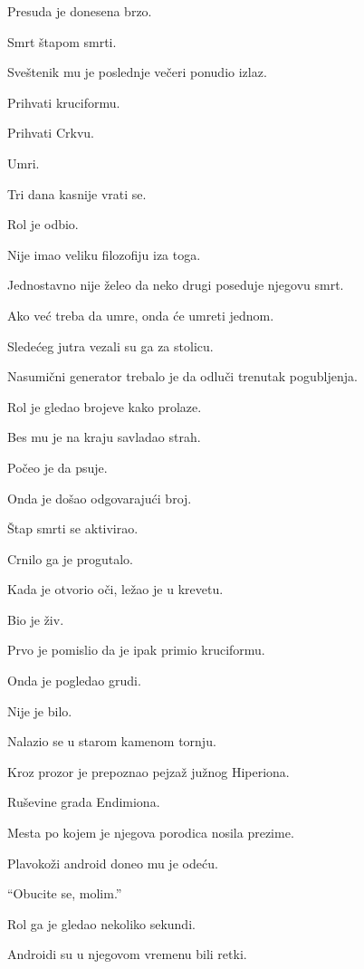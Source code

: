 Presuda je donesena brzo.

Smrt štapom smrti.

\bigskip

Sveštenik mu je poslednje večeri ponudio izlaz.

Prihvati kruciformu.

Prihvati Crkvu.

Umri.

Tri dana kasnije vrati se.

\bigskip

Rol je odbio.

Nije imao veliku filozofiju iza toga.

Jednostavno nije želeo da neko drugi poseduje njegovu smrt.

Ako već treba da umre, onda će umreti jednom.

\bigskip

Sledećeg jutra vezali su ga za stolicu.

Nasumični generator trebalo je da odluči trenutak pogubljenja.

Rol je gledao brojeve kako prolaze.

Bes mu je na kraju savladao strah.

Počeo je da psuje.

Onda je došao odgovarajući broj.

Štap smrti se aktivirao.

Crnilo ga je progutalo.

\bigskip

Kada je otvorio oči, ležao je u krevetu.

Bio je živ.

\bigskip

Prvo je pomislio da je ipak primio kruciformu.

Onda je pogledao grudi.

Nije je bilo.

Nalazio se u starom kamenom tornju.

Kroz prozor je prepoznao pejzaž južnog Hiperiona.

Ruševine grada Endimiona.

Mesta po kojem je njegova porodica nosila prezime.

\bigskip

Plavokoži android doneo mu je odeću.

``Obucite se, molim.''

Rol ga je gledao nekoliko sekundi.

Androidi su u njegovom vremenu bili retki.

